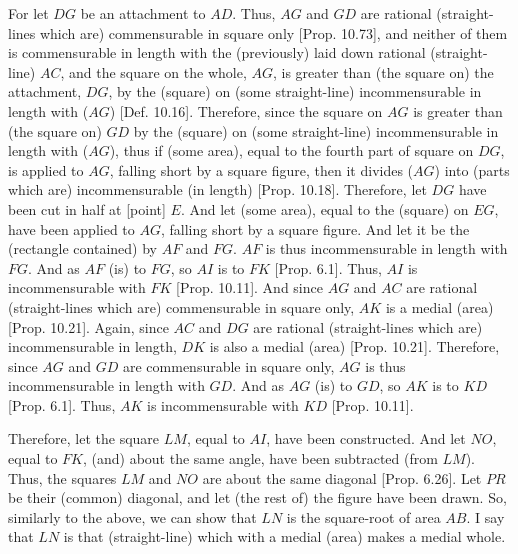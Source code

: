 \begin{Parallel}{}{}
{For let $DG$ be an attachment to $AD$. Thus, $AG$ and $GD$ are rational (straight-lines which are) commensurable in square only [Prop. 10.73], and neither of them is
commensurable in length with the (previously) laid down rational (straight-line) $AC$, and the square on the whole, $AG$, is greater than (the square on)
the attachment, $DG$, by the (square) on (some straight-line)
incommensurable in length with ($AG$) [Def. 10.16]. Therefore, since the square on $AG$
is greater than (the square on) $GD$ by the (square) on (some straight-line)
incommensurable in length with ($AG$), thus if (some area), equal to
the fourth part of square on $DG$, is applied to $AG$, falling short
by a square figure, then it divides ($AG$) into (parts which are) incommensurable
(in length) [Prop. 10.18]. Therefore, let $DG$ have been cut in  half at [point] $E$. And let (some area), equal to the
(square) on $EG$, have been applied to $AG$, falling short by a square figure.
And let it be the (rectangle contained) by $AF$ and $FG$. $AF$ is
thus incommensurable in length with $FG$. And as $AF$ (is) to $FG$,
so $AI$ is to $FK$ [Prop. 6.1].  Thus, $AI$
is incommensurable with $FK$ [Prop. 10.11]. 
And since $AG$ and $AC$ are rational (straight-lines which are)
commensurable in square only, $AK$ is a medial (area) [Prop. 10.21]. Again, since $AC$ and $DG$
are rational (straight-lines which are) incommensurable in length, $DK$
is also a medial (area) [Prop. 10.21]. Therefore,
since $AG$ and $GD$ are commensurable in square only,  $AG$
is thus incommensurable in length with $GD$. And as $AG$ (is) to $GD$,
so $AK$ is to $KD$ [Prop. 6.1]. Thus, $AK$
is incommensurable with $KD$ [Prop. 10.11].

Therefore, let the square $LM$, equal to $AI$, have been constructed.
And let $NO$, equal to $FK$, (and) about the same angle, have been subtracted (from $LM$). Thus, the squares $LM$ and $NO$ are about the
same diagonal [Prop. 6.26]. 
Let $PR$ be their (common) diagonal, and let (the rest of) the figure have been drawn.
So, similarly to the above, we can show that $LN$ is the square-root of
area $AB$. I say that $LN$ is  that (straight-line) which with a medial (area) makes a medial whole.

}
\end{Parallel}
